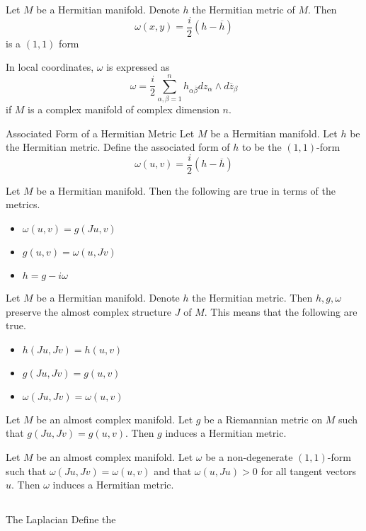 \documentclass[a4paper]{article}
\begin{document}
\begin{lmm}{}{} Let $M$ be a Hermitian manifold. Denote $h$ the Hermitian metric of $M$. Then $$\omega(x,y)=\frac{i}{2}(h-\overline{h})$$ is a $(1,1)$ form 
\end{lmm}

In local coordinates, $\omega$ is expressed as $$\omega=\frac{i}{2}\sum_{\alpha,\beta=1}^n h_{\alpha\overline{\beta}}dz_{\alpha}\wedge d\overline{z}_\beta$$ if $M$ is a complex manifold of complex dimension $n$. 

\begin{defn}{Associated Form of a Hermitian Metric}{} Let $M$ be a Hermitian manifold. Let $h$ be the Hermitian metric. Define the associated form of $h$ to be the $(1,1)$-form $$\omega(u,v)=\frac{i}{2}(h-\overline{h})$$
\end{defn}

\begin{prp}{}{} Let $M$ be a Hermitian manifold. Then the following are true in terms of the metrics. 
\begin{itemize}
\item $\omega(u,v)=g(Ju,v)$
\item $g(u,v)=\omega(u,Jv)$
\item $h=g-i\omega$
\end{itemize}
\end{prp}

\begin{thm}{}{} Let $M$ be a Hermitian manifold. Denote $h$ the Hermitian metric. Then $h,g,\omega$ preserve the almost complex structure $J$ of $M$. This means that the following are true. 
\begin{itemize}
\item $h(Ju,Jv)=h(u,v)$
\item $g(Ju,Jv)=g(u,v)$
\item $\omega(Ju,Jv)=\omega(u,v)$
\end{itemize}
\end{thm}

\begin{lmm}{}{} Let $M$ be an almost complex manifold. Let $g$ be a Riemannian metric on $M$ such that $g(Ju,Jv)=g(u,v)$. Then $g$ induces a Hermitian metric. 
\end{lmm}

\begin{lmm}{}{} Let $M$ be an almost complex manifold. Let $\omega$ be a non-degenerate $(1,1)$-form such that $\omega(Ju,Jv)=\omega(u,v)$ and that $\omega(u,Ju)>0$ for all tangent vectors $u$. Then $\omega$ induces a Hermitian metric. 
\end{lmm}

\subsection{}
\begin{defn}{The Laplacian}{} Define the 
\end{defn}
\end{document}
